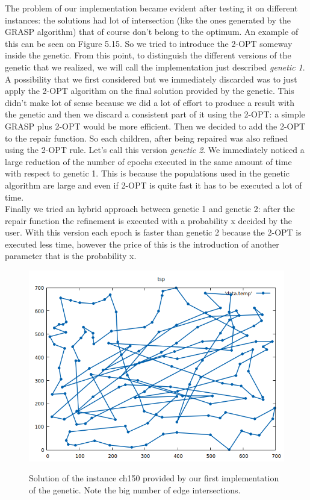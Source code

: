 \noindent The problem of our implementation became evident after testing it on different instances: the solutions had lot of intersection (like the ones generated by the GRASP algorithm) that of course don't belong to the optimum. An example of this can be seen on Figure 5.15. So we tried to introduce the 2-OPT someway inside the genetic. From this point, to distinguish the different versions of the genetic that we realized, we will call the implementation just described \textit{genetic 1}. \\
A possibility that we first considered but we immediately discarded was to just apply the 2-OPT algorithm on the final solution provided by the genetic. This didn't make lot of sense because we did a lot of effort to produce a result with the genetic and then we discard a consistent part of it using the 2-OPT: a simple GRASP plus 2-OPT would be more efficient.
Then we decided to add the 2-OPT to the repair function. So each children, after being repaired was also refined using the 2-OPT rule. Let's call this version \textit{genetic 2}. We immediately noticed a large reduction of the number of epochs executed in the same amount of time with respect to genetic 1. This is because the populations used in the genetic algorithm are large and even if 2-OPT is quite fast it has to be executed a lot of time. \\
Finally we tried an hybrid approach between genetic 1 and genetic 2: after the repair function the refinement is executed with a probability x decided by the user. With this version each epoch is faster than genetic 2 because the 2-OPT is executed less time, however the price of this is the introduction of another parameter that is the probability x.\\

\begin{figure}[h!]
\centering
	\includegraphics[scale=0.6]{media/genetic.png} \\
	\caption{Solution of the instance ch150 provided by our first implementation of the genetic. Note the big number of edge intersections.}
\end{figure}

